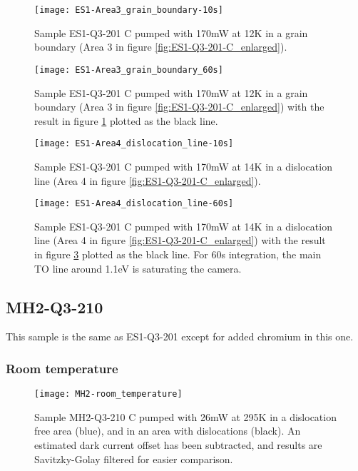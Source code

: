 \begin{figure}[H]
\centering
\texttt{[image: ES1-Area3\_grain\_boundary-10s]}
\caption[ES1-Q3-201 at a grain boundary]{Sample ES1-Q3-201 C pumped with 170mW at 12K in a grain boundary (Area 3 in figure \ref{fig:ES1-Q3-201-C_enlarged}).}
\label{fig:ES1-Area3_grain_boundary-10s}%
\end{figure}

\begin{figure}[H]
\centering
\texttt{[image: ES1-Area3\_grain\_boundary\_60s]}
\caption[ES1-Q3-201 at a grain boundary]{Sample ES1-Q3-201 C pumped with 170mW at 12K in a grain boundary (Area 3 in figure \ref{fig:ES1-Q3-201-C_enlarged}) with the result in figure \ref{fig:ES1-Area3_grain_boundary-10s} plotted as the black line.}
\label{fig:ES1-Area3_grain_boundary_60s}%
\end{figure}


\begin{figure}[H]
\centering
\texttt{[image: ES1-Area4\_dislocation\_line-10s]}
\caption[ES1-Q3-201 at a dislocation line]{Sample ES1-Q3-201 C pumped with 170mW at 14K in a dislocation line (Area 4 in figure \ref{fig:ES1-Q3-201-C_enlarged}).}
\label{fig:ES1-Area4_dislocation_line-10s}%
\end{figure}

\begin{figure}[H]
\centering
\texttt{[image: ES1-Area4\_dislocation\_line-60s]}
\caption[ES1-Q3-201 at a dislocation line]{Sample ES1-Q3-201 C pumped with 170mW at 14K in a dislocation line (Area 4 in figure \ref{fig:ES1-Q3-201-C_enlarged}) with the result in figure \ref{fig:ES1-Area4_dislocation_line-10s} plotted as the black line. For 60s integration, the main TO line around 1.1eV is saturating the camera.}
\label{fig:ES1-Area4_dislocation_line-60s}%
\end{figure}

\subsection{MH2-Q3-210}

This sample is the same as ES1-Q3-201 except for added chromium in this one.

\subsubsection{Room temperature}

\begin{figure}[H]
\centering
\texttt{[image: MH2-room\_temperature]}
\caption[MH2-Q3-210 at room temperature]{Sample MH2-Q3-210 C pumped with 26mW at 295K in a dislocation free area (blue), and in an area with dislocations (black). An estimated dark current offset has been subtracted, and results are Savitzky-Golay filtered for easier comparison.}
\label{fig:MH2-room_temperature}%
\end{figure}

